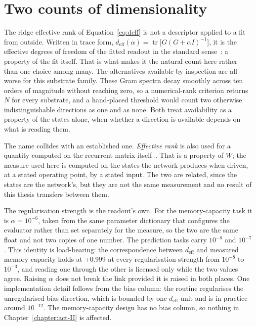 \section{Two counts of dimensionality}
\label{sec:methods-counts}
\bigskip

The ridge effective rank of Equation~\ref{eq:deff} is not a descriptor applied to
a fit from outside. Written in trace form,
$d_{\mathrm{eff}}(\alpha) = \operatorname{tr}\bigl[G(G + \alpha I)^{-1}\bigr]$,
it is the effective degrees of freedom of the fitted readout in the standard
sense~\cite{hastie2009elements}: a property of the fit itself. That is what makes
it the natural count here rather than one choice among many. The alternatives
available by inspection are all worse for this substrate family. These Gram
spectra decay smoothly across ten orders of magnitude without reaching zero, so a
numerical-rank criterion returns $N$ for every substrate, and a hand-placed
threshold would count two otherwise indistinguishable directions as one and as
none. Both treat availability as a property of the states alone, when whether a
direction is available depends on what is reading them.

The name collides with an established one. \emph{Effective rank} is also used for
a quantity computed on the recurrent matrix
itself~\cite{clark2025connectivity}. That is a property of $W$; the measure used
here is computed on the states the network produces when driven, at a stated
operating point, by a stated input. The two are related, since the states are the
network's, but they are not the same measurement and no result of this thesis
transfers between them.

The regularisation strength is the readout's own. For the memory-capacity task it
is $\alpha = 10^{-6}$, %
taken from the same parameter dictionary that configures the evaluator rather
than set separately for the measure, so the two are the same float and not two
copies of one number. The prediction tasks carry
$10^{-8}$ and $10^{-7}$. %
This identity is load-bearing: the correspondence between $d_{\mathrm{eff}}$ and
measured memory capacity holds at
+0.999 %
at every regularisation strength from $10^{-8}$ to $10^{-3}$, and reading one
through the other is licensed only while the two values agree. Raising $\alpha$
does not break the link provided it is raised in both places. One implementation
detail follows from the bias column: the routine regularises the unregularised
bias direction, which is bounded by
one $d_{\mathrm{eff}}$ unit %
and is in practice around $10^{-12}$. The memory-capacity design has no bias
column, so nothing in Chapter~\ref{chapter:act-II} is affected.

